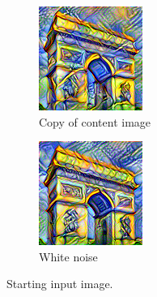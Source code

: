 \documentclass[twocolumn,superscriptaddress,aps,floatfix,nofootinbib]{revtex4-1}
\begin{document}
    \begin{figure}[ht]
        \centering
        \begin{subfigure}[b]{0.22\textwidth}
            \centering
            \includegraphics[width=\textwidth]{resources/png/inputs/sun-trees-paris-copy.png}
            \caption{Copy of content image}
        \end{subfigure}
        \hfill
        \begin{subfigure}[b]{0.22\textwidth}
            \centering
            \includegraphics[width=\textwidth]{resources/png/inputs/sun-trees-paris-noisy.png}
            \caption{White noise}
        \end{subfigure}
        \caption{Starting input image.}
        \label{fig:input.image.variations}
    \end{figure}
    
\end{document}
